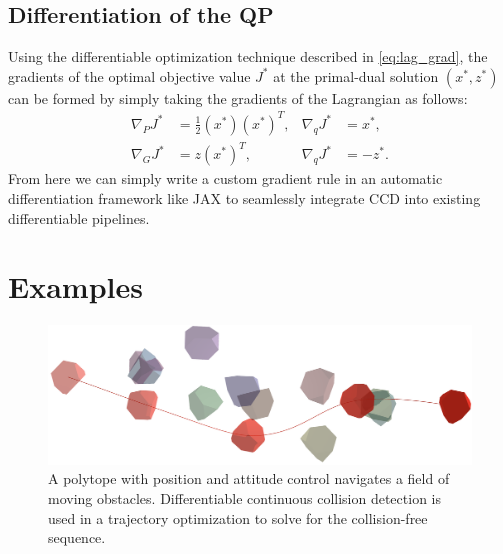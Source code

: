 \subsection{Differentiation of the QP}
%
%
Using the differentiable optimization technique described in \eqref{eq:lag_grad}, the gradients of the optimal objective value $J^*$ at the primal-dual solution $(x^*, z^*)$ can be formed by simply taking the gradients of the Lagrangian as follows:
%
\begin{align}
    \nabla_P J^* &= \frac{1}{2} (x^*) (x^*)^T, & \nabla_q J^* &= x^*, \\
    \nabla_G J^* &= z (x^*)^T, & \nabla_q J^* &= -z^*. 
\end{align}
%
From here we can simply write a custom gradient rule in an automatic differentiation framework like JAX to seamlessly integrate CCD into existing differentiable pipelines. 
%
%
%
%
\section{Examples} \label{sec:cdcol:examples}
\begin{figure}[t!]
    \centering
    \includegraphics[width=.47\textwidth]{figures/hallway/hallway1.png}
    \caption{A polytope with position and attitude control navigates a field of moving obstacles. Differentiable continuous collision detection is used in a trajectory optimization to solve for the collision-free sequence.}
    \label{fig:hallway2}
\end{figure}




